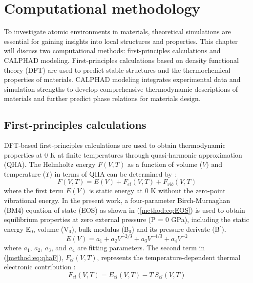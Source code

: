 \chapter{Computational methodology} \label{chap:method}
To investigate atomic environments in materials, theoretical simulations are essential for gaining insights into local structures and properties. This chapter will discuss two computational methods: first-principles calculations and CALPHAD modeling. First-principles calculations based on density functional theory (DFT) are used to predict stable structures and the thermochemical properties of materials. CALPHAD modeling integrates experimental data and simulation strengths to develop comprehensive thermodynamic descriptions of materials and further predict phase relations for materials design.

\section{First-principles calculations} \label{method:sec:firstprinciples}
DFT-based first-principles calculations are used to obtain thermodynamic properties at 0 K at finite temperatures through quasi-harmonic approximation (QHA). The Helmholtz energy $F(V,T)$ as a function of volume ($V$) and temperature ($T$) in terms of QHA can be determined by \cite{shang2010first}:
\begin{equation} \label{method:eq:qhaF}
    F\left(V,T\right)=E\left(V\right)+F_{el}\left(V,T\right)+F_{vib}(V,T)
\end{equation}
where the first term $E\left(V\right)$ is static energy at 0 K without the zero-point vibrational energy. In the present work, a four-parameter Birch-Murnaghan (BM4) equation of state (EOS) \cite{shang2010first} as shown in (\ref{method:eq:EOS}) is used to obtain equilibrium properties at zero external pressure (P = 0 GPa), including the static energy E$_0$, volume (V$_0$), bulk modulus (B$_0$) and its pressure derivate (B$^\prime$).
\begin{equation} \label{method:eq:EOS}
    E\left(V\right)=a_1+a_2V^{-2/3}+a_3V^{-4/3}+a_4V^{-2}
\end{equation}
where $a_1$, $a_2$, $a_3$, and $a_4$ are fitting parameters. The second term in (\ref{method:eq:qhaF}), $F_{el}\left(V,T\right)$, represents the temperature-dependent thermal electronic contribution \cite{wang2004thermodynamic}:
\begin{equation} \label{method:eq:Fel}
    F_{el}(V,T)=E_{el}(V,T)-T\:S_{el}(V,T)
\end{equation}
